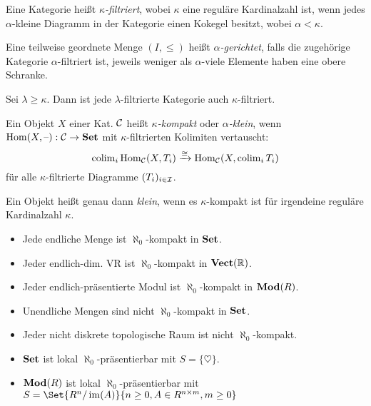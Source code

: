 \documentclass{cheat-sheet}
\begin{document}
\begin{defn}
  Eine Kategorie heißt \emph{$\kappa$-filtriert}, wobei $\kappa$ eine reguläre Kardinalzahl ist, wenn jedes $\alpha$-kleine Diagramm in der Kategorie einen Kokegel besitzt, wobei $\alpha < \kappa$.
\end{defn}

\begin{defn}
  Eine teilweise geordnete Menge $(I, \leq)$ heißt \emph{$\alpha$-gerichtet}, falls die zugehörige Kategorie $\alpha$-filtriert ist, \dh{} jeweils weniger als $\alpha$-viele Elemente haben eine obere Schranke.
\end{defn}

\begin{bem}
  Sei $\lambda \geq \kappa$. Dann ist jede $\lambda$-filtrierte Kategorie auch $\kappa$-filtriert.
\end{bem}

\begin{defn}
  Ein Objekt $X$ einer Kat. $\mathcal{C}$ heißt \emph{$\kappa$-kompakt} oder \emph{$\alpha$-klein}, wenn $\operatorname{Hom}(X, \text{--}) : \mathcal{C} \to \mathbf{Set}$ mit $\kappa$-filtrierten Kolimiten vertauscht:
  \[
    \operatorname{colim}_i \operatorname{Hom}_{\mathcal{C}}(X, T_i) \xrightarrow{\cong} \operatorname{Hom}_{\mathcal{C}}(X, \operatorname{colim}_i T_i)
  \]
  für alle $\kappa$-filtrierte Diagramme $(T_i)_{i \in \mathcal{I}}$.
\end{defn}

\begin{defn}
  Ein Objekt heißt genau dann \emph{klein}, wenn es $\kappa$-kompakt ist für irgendeine reguläre Kardinalzahl $\kappa$.
\end{defn}

\iffalse
\begin{idee}
  Sei $X$ eine endliche Menge. Sei $X \subset \cup_{i \in \N} T_i$, $T_i \subseteq T_{i+1}$. Dann liegt $X$ schon vollständig in einem der $T_i$.
\end{idee}
\fi

\begin{bspe}
  \begin{itemize}
    \item Jede endliche Menge ist $\aleph_0$-kompakt in $\mathbf{Set}$.
    \item Jeder endlich-dim. VR ist $\aleph_0$-kompakt in $\mathbf{Vect}(\mathbb{R})$.
    \item Jeder endlich-präsentierte Modul ist $\aleph_0$-kompakt in $\mathbf{Mod}(R)$.
    \item Unendliche Mengen sind nicht $\aleph_0$-kompakt in $\mathbf{Set}$.
    \item Jeder nicht diskrete topologische Raum ist nicht $\aleph_0$-kompakt.
    \item $\mathbf{Set}$ ist lokal $\aleph_0$-präsentierbar mit $S = \{ \heartsuit \}$.
    \item $\mathbf{Mod}(R)$ ist lokal $\aleph_0$-präsentierbar mit $S = \Set{R^n/\im(A)}{n \geq 0, A \in R^{n \times m}, m \geq 0}$
  \end{itemize}
\end{bspe}
\end{document}
